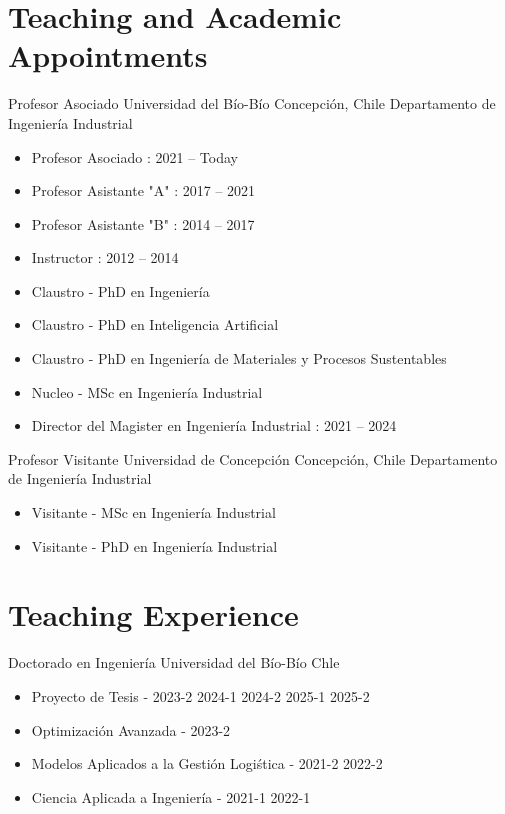 \section{Teaching and Academic Appointments}

{Profesor Asociado}
{Universidad del B\'io-B\'io}
{Concepci\'on, Chile}
{Departamento de Ingenier\'ia Industrial}
{\begin{itemize}
\item Profesor Asociado      : 2021 -- Today
\item Profesor Asistante "A" : 2017 -- 2021
\item Profesor Asistante "B" : 2014 -- 2017
\item Instructor             : 2012 -- 2014
\item Claustro    - PhD en Ingenier\'ia
\item Claustro    - PhD en Inteligencia Artificial
\item Claustro    - PhD en Ingenier\'ia de Materiales y Procesos Sustentables
\item Nucleo      - MSc en Ingenier\'ia Industrial
\item Director del Magister en Ingenier\'ia Industrial : 2021 -- 2024
\end{itemize}}

{Profesor Visitante}
{Universidad de Concepci\'on}
{Concepci\'on, Chile}
{Departamento de Ingenier\'ia Industrial}
{\begin{itemize}
\item Visitante - MSc en Ingenier\'ia Industrial
\item Visitante - PhD en Ingenier\'ia Industrial
\end{itemize}}

\section{Teaching Experience}


{Doctorado en Ingenier\'ia}
{Universidad del B\'io-B\'io}
{Chle}
{}
{\begin{itemize}
\item Proyecto de Tesis - 2023-2 2024-1 2024-2 2025-1 2025-2
\item Optimizaci\'on Avanzada - 2023-2
\item Modelos Aplicados a la Gesti\'on Logi\'stica - 2021-2 2022-2
\item Ciencia Aplicada a Ingenier\'ia - 2021-1 2022-1
\end{itemize}}

